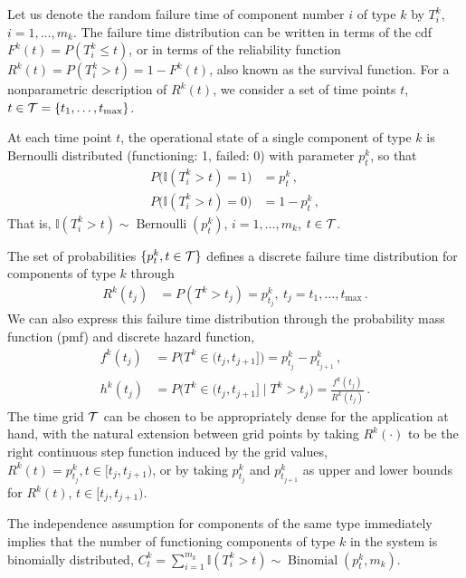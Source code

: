 \documentclass[12pt, a4paper]{elsarticle}
\newcommand{\indic}{\mathbb{I}}
\newcommand{\ber}{\operatorname{Bernoulli}}
\newcommand{\bin}{\operatorname{Binomial}}
\def\tmax{t_\text{max}}
\newcommand{\ptk}{p^k_t}
\begin{document}
Let us denote the random failure time of component number $i$ of type $k$ by $T^k_i$, $i = 1, \ldots, m_k$.
The failure time distribution can be written in terms of the cdf $F^k(t) = P(T^k_i \le t)$,
or in terms of the reliability function $R^k(t) = P(T^k_i > t) = 1 - F^k(t)$,
also known as the survival function.
For a nonparametric description of $R^k(t)$,
we consider a set of time points $t$, $t \in {\cal T} = \{t_1, \ldots, \tmax\}$.

At each time point $t$, the operational state of a single component of type $k$
is Bernoulli distributed (functioning: 1, failed: 0) with parameter $\ptk$, so that
\begin{align*}
P\big(\indic(T^k_i > t) = 1\big) &= \ptk\,, \\
P\big(\indic(T^k_i > t) = 0\big) &= 1 - \ptk\,,
\end{align*}
That is, $\indic(T^k_i > t) \sim \ber(\ptk)$, $i = 1, \ldots, m_k$, $t \in {\cal T}$.

The set of probabilities $\{ \ptk, t \in {\cal T}\}$
defines a discrete failure time distribution for components of type $k$ through
\begin{align*}
R^k(t_j) &= P(T^k > t_j) = p^k_{t_j},\ t_j = t_1, \ldots, \tmax\,.
\end{align*}
We can also express this failure time distribution through the probability mass function (pmf) and discrete hazard function,
\begin{align*}
f^k(t_j) &= P\big(T^k \in (t_j,t_{j+1}]\big) = p^k_{t_j} - p^k_{t_{j+1}}\,,\\ 
h^k(t_j) &= P\big(T^k \in (t_j,t_{j+1}]\mid T^k > t_j\big) = \frac{f^k(t_j)}{R^k(t_j)}\,. %
\end{align*}
The time grid $\cal T$ can be chosen to be appropriately dense for the application at hand,
with the natural extension between grid points by taking $R^k(\cdot)$ to be the right continuous step function induced by the grid values,
$R^k(t) = p^k_{t_j}, t \in [t_j, t_{j+1})$,
or by taking $p^k_{t_j}$ and $p^k_{t_{j+1}}$ as upper and lower bounds for $R^k(t)$, $t \in [t_j, t_{j+1})$.

The independence assumption for components of the same type immediately implies that 
the number of functioning components of type $k$ in the system
is binomially distributed, $C^k_t = \sum_{i=1}^{m_k} \indic(T^k_i > t) \sim \bin(\ptk, m_k)$.
\end{document}
